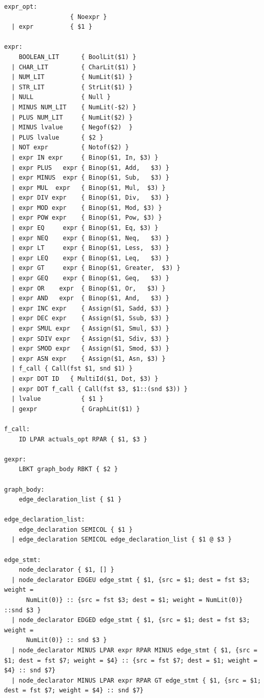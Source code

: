 \documentclass[a4paper,12pt]{article}
\begin{document}
\begin{lstlisting}
expr_opt:
                  { Noexpr }
  | expr          { $1 }

expr:
    BOOLEAN_LIT      { BoolLit($1) }
  | CHAR_LIT         { CharLit($1) }
  | NUM_LIT          { NumLit($1) }
  | STR_LIT          { StrLit($1) }
  | NULL             { Null }
  | MINUS NUM_LIT    { NumLit(-$2) }
  | PLUS NUM_LIT     { NumLit($2) }
  | MINUS lvalue     { Negof($2)  }
  | PLUS lvalue      { $2 }
  | NOT expr         { Notof($2) } 
  | expr IN expr     { Binop($1, In, $3) }
  | expr PLUS   expr { Binop($1, Add,   $3) }
  | expr MINUS  expr { Binop($1, Sub,   $3) }
  | expr MUL  expr   { Binop($1, Mul,  $3) }
  | expr DIV expr    { Binop($1, Div,   $3) }
  | expr MOD expr    { Binop($1, Mod, $3) }
  | expr POW expr    { Binop($1, Pow, $3) }
  | expr EQ     expr { Binop($1, Eq, $3) }
  | expr NEQ    expr { Binop($1, Neq,   $3) }
  | expr LT     expr { Binop($1, Less,  $3) }
  | expr LEQ    expr { Binop($1, Leq,   $3) }
  | expr GT     expr { Binop($1, Greater,  $3) }
  | expr GEQ    expr { Binop($1, Geq,   $3) }
  | expr OR    expr  { Binop($1, Or,   $3) }
  | expr AND   expr  { Binop($1, And,   $3) }
  | expr INC expr    { Assign($1, Sadd, $3) }
  | expr DEC expr    { Assign($1, Ssub, $3) }
  | expr SMUL expr   { Assign($1, Smul, $3) }
  | expr SDIV expr   { Assign($1, Sdiv, $3) }
  | expr SMOD expr   { Assign($1, Smod, $3) }
  | expr ASN expr    { Assign($1, Asn, $3) }
  | f_call { Call(fst $1, snd $1) }
  | expr DOT ID   { MultiId($1, Dot, $3) }
  | expr DOT f_call { Call(fst $3, $1::(snd $3)) }  
  | lvalue           { $1 }
  | gexpr            { GraphLit($1) }

f_call:
    ID LPAR actuals_opt RPAR { $1, $3 }

gexpr:
    LBKT graph_body RBKT { $2 }

graph_body:
    edge_declaration_list { $1 }

edge_declaration_list:
    edge_declaration SEMICOL { $1 }
  | edge_declaration SEMICOL edge_declaration_list { $1 @ $3 }

edge_stmt:
    node_declarator { $1, [] }
  | node_declarator EDGEU edge_stmt { $1, {src = $1; dest = fst $3; weight =
      NumLit(0)} :: {src = fst $3; dest = $1; weight = NumLit(0)} ::snd $3 }
  | node_declarator EDGED edge_stmt { $1, {src = $1; dest = fst $3; weight =
      NumLit(0)} :: snd $3 }
  | node_declarator MINUS LPAR expr RPAR MINUS edge_stmt { $1, {src = $1; dest = fst $7; weight = $4} :: {src = fst $7; dest = $1; weight = $4} :: snd $7}
  | node_declarator MINUS LPAR expr RPAR GT edge_stmt { $1, {src = $1; dest = fst $7; weight = $4} :: snd $7}


\end{lstlisting}
\end{document}

